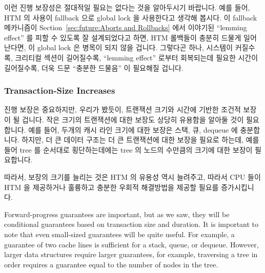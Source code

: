 이런 진행 보장성은 절대적일 필요는 없다는 것을 알아두시기 바랍니다.
예를 들어, HTM 의 사용이 fallback 으로 global lock 을 사용한다고 생각해 봅시다.
이 fallback 메카니즘이
Section~\ref{sec:future:Aborts and Rollbacks} 에서 이야기된 ``lemming effect''
를 피할 수 있도록 잘 설계되었다고 하면, HTM 롤백들이 충분히 드물게 일어난다면,
이 global lock 은 병목이 되지 않을 겁니다.
그렇다곤 하나, 시스템이 커질수록, 크리티컬 섹션이 길어질수록, ``lemming
effect'' 로부터 회복되는데 필요한 시간이 길어질수록, 더욱 드문 ``충분한
드물음'' 이 필요해질 겁니다.
\iffalse

Nevertheless, these constraints support a number of important data structures,
including linked lists, stacks, queues, and arrays.
Constrained HTM therefore seems likely to become an important tool in
the parallel programmer's toolbox.

Note that these forward-progress guarantees need not be absolute.
For example, suppose that a use of HTM uses a global lock as fallback.
Assuming that the fallback mechanism has been carefully designed to
avoid the ``lemming effect'' discussed in
Section~\ref{sec:future:Aborts and Rollbacks},
then if HTM rollbacks are sufficiently infrequent, the global lock
will not be a bottleneck.
That said, the larger the system, the longer the critical sections,
and the longer the time required to recover from the ``lemming effect'',
the more rare ``sufficiently infrequent'' needs to be.
\fi

\subsubsection{Transaction-Size Increases}
\label{sec:future:Transaction-Size Increases}

진행 보장은 중요하지만, 우리가 봤듯이, 트랜잭션 크기와 시간에 기반한 조건적
보장이 될 겁니다.
작은 크기의 트랜잭션에 대한 보장도 상당히 유용함을 알아둘 것이 필요합니다.
예를 들어, 두개의 캐시 라인 크기에 대한 보장은 스택, 큐, dequeue 에 충분합니다.
하지만, 더 큰 데이터 구조는 더 큰 트랜잭션에 대한 보장을 필요로 하는데, 예를
들어 tree 를 순서대로 횡단하는데에는 tree 의 노드의 수만큼의 크기에 대한 보장이
필요합니다.

따라서, 보장의 크기를 늘리는 것은 HTM 의 유용성 역시 늘려주고, 따라서 CPU 들이
HTM 을 제공하거나 훌륭하고 충분한 우회적 해결방법을 제공할 필요를 증가시킵니다.
\iffalse

Forward-progress guarantees are important, but as we saw, they will
be conditional guarantees based on transaction size and duration.
It is important to note that even small-sized guarantees will be
quite useful.
For example,
a guarantee of two cache lines is sufficient for a stack, queue, or dequeue.
However, larger data structures require larger guarantees, for example,
traversing a tree in order requires a guarantee equal to the number
of nodes in the tree.

